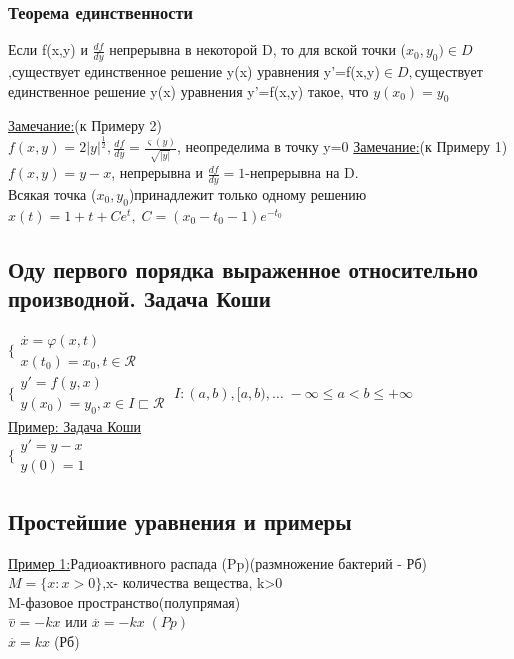 \documentclass[12pt]{article}
\begin{document}
  \subsubsection*{Теорема единственности}\label{th:1.3.2}
  Если f(x,y) и $\frac{df}{dy}$ непрерывна в некоторой D, то для вской точки ($x_0,y_0) \in D$
  ,существует единственное решение y(x) уравнения y'=f(x,y)$\in D,$существует единственное решение
  y(x) уравнения y'=f(x,y) такое, что $y(x_0)=y_0$\par\noindent
  \underline{Замечание:}(к Примеру 2)\\
  $f(x,y)=2|y|^\frac{1}{2},\frac{df}{dy}=\frac{\varsigma(y)}{\sqrt{|y|}}$, неопределима в точку y=0
  \underline{Замечание:}(к Примеру 1)\\
  $f(x,y)=y-x$, непрерывна и $\frac{df}{dy}=1$-непрерывна на D.\\
  Всякая точка ($x_0,y_0$)принадлежит только одному решению\\
  $x(t)=1+t+Ce^t, \; C=(x_0-t_0-1)e^{-t_0}$
  \subsection{Оду первого порядка выраженное относительно производной. Задача Коши}
  $\Bigg\{\begin{aligned}
    \overset{.}{x}=\varphi(x,t)\\
    x(t_0)=x_0, t \in \mathcal{R}
  \end{aligned}$\\
  $\Bigg\{\begin{aligned}
    y'=f(y,x)\\
    y(x_0)=y_0,x \in I \sqsubset \mathcal{R}
  \end{aligned} \; I:(a,b),[a,b),\dots \; -\infty \leq a < b \leq +\infty$\\
  \underline{Пример: Задача Коши}\\
  $\Bigg\{\begin{aligned}
    y'=y-x\\
    y(0)=1
  \end{aligned}$
  \subsection*{Простейшие уравнения и примеры}
  \underline{Пример 1:}Радиоактивного распада (Pp)(размножение бактерий - Рб)\\
  $M=\{x:x>0\}$,x- количества вещества, k>0\\
  M-фазовое пространство(полупрямая)\\
  $\overset{-}{v}=-kx$ или $\overset{.}{x}=-kx \; (Pp)$\\
  $\overset{.}{x}=kx \;$(Рб)
\end{document}
